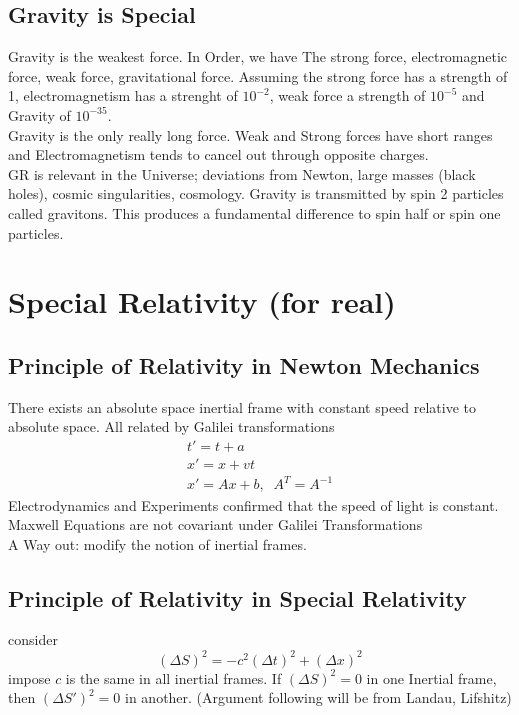 \documentclass[]{scrartcl}
\begin{document}
\subsection{Gravity is Special}
Gravity is the weakest force. In Order, we have The strong force, electromagnetic force, weak force, gravitational force. Assuming the strong force has a strength of 1, electromagnetism has a strenght of $10^{-2}$, weak force a strength of $10^{-5}$ and Gravity of $10^{-35}$.\\
Gravity is the only really long force. Weak and Strong forces have short ranges and Electromagnetism tends to cancel out through opposite charges.\\
GR is relevant in the Universe; deviations from Newton, large masses (black holes), cosmic singularities, cosmology. Gravity is transmitted by spin 2 particles called gravitons. This produces a fundamental difference to spin half or spin one particles. 


\section{Special Relativity (for real)}

\subsection{Principle of Relativity in Newton Mechanics}
There exists an absolute space inertial frame with constant speed relative to absolute space. All related by Galilei transformations
\begin{gather}
	t' = t + a\\
	x' = x + vt\\
	x' = Ax + b, \;\; A^T = A^{-1}
\end{gather}
Electrodynamics and Experiments confirmed that the speed of light is constant. Maxwell Equations are not covariant under Galilei Transformations\\
A Way out: modify the notion of inertial frames.

\subsection{Principle of Relativity in Special Relativity}
consider $$(\Delta S)^2 = -c^2 (\Delta t)^2 + (\Delta x)^2$$
impose $c$ is the same in all inertial frames. If $(\Delta S)^2 = 0$ in one Inertial frame, then $(\Delta S')^2 = 0$ in another. (Argument following will be from Landau, Lifshitz)
\end{document}
